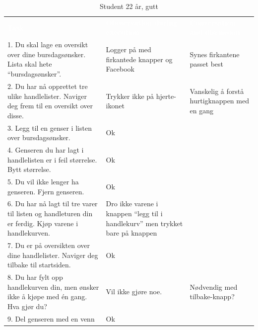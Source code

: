 \begin{table}[H]
    \caption{Student 22 år, gutt}
    \label{tab:observasjon2_2}
    \centering
    \begin{tabular}{|L{15em}  L{15em} L{15em}|}
    \hline
        \textbf{\textcolor{white}{Task}} & \textbf{\textcolor{white}{Obeservation during execution}} & \textbf{\textcolor{white}{Conversation and discussion}}\\
        1. Du skal lage en oversikt over dine bursdagsønsker. Lista skal hete “bursdagsønsker”. & Logger på med firkantede knapper og Facebook & Synes firkantene passet best\\
        2. Du har nå opprettet tre ulike handlelister. Naviger deg frem til en oversikt over disse. & Trykker ikke på hjerte-ikonet & Vanskelig å forstå hurtigknappen med en gang \\
        3. Legg til en genser i listen over bursdagsønsker. & Ok & \\ 
        4. Genseren du har lagt i handlelisten er i feil størrelse. Bytt størrelse. & Ok & \\
        5. Du vil ikke lenger ha genseren. Fjern genseren. & Ok & \\
        6. Du har nå lagt til tre varer til listen og handleturen din er ferdig. Kjøp varene i handlekurven. & Dro ikke varene i knappen “legg til i handlekurv” men trykket bare på knappen & \\
        7. Du er på oversikten over dine handlelister. Naviger deg tilbake til startsiden. & Ok & \\
        8. Du har fylt opp handlekurven din, men ønsker ikke å kjøpe med én gang. Hva gjør du? & Vil ikke gjøre noe. & Nødvendig med tilbake-knapp?\\
        9. Del genseren med en venn & Ok & \\
        \hline
    \end{tabular}
\end{table}

